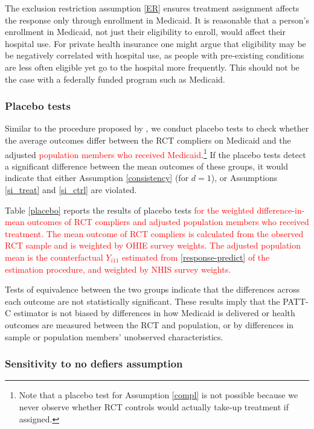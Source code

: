 \documentclass[hidelinks,12pt]{article}
\begin{document}
The exclusion restriction assumption \eqref{ER} ensures treatment assignment affects the response only through enrollment in Medicaid. It is reasonable that a person's enrollment in Medicaid, not just their eligibility to enroll, would affect their hospital use. For private health insurance one might argue that eligibility may be be negatively correlated with hospital use, as people with pre-existing conditions are less often eligible yet go to the hospital more frequently. This should not be the case with a federally funded program such as Medicaid. 

\subsubsection{Placebo tests} \label{placebo-tests}

Similar to the procedure proposed by \citep{Hartman}, we conduct placebo tests to check whether the average outcomes differ between the RCT compliers on Medicaid and the adjusted \textcolor{red}{population members who received Medicaid}.\footnote{Note that a placebo test for Assumption \eqref{compl} is not possible because we never observe whether RCT controls would actually take-up treatment if assigned.} If the placebo tests detect a significant difference between the mean outcomes of these groups, it would indicate that either Assumption \eqref{consistency} (for $d=1$), or Assumptions \eqref{si_treat} and \eqref{si_ctrl} are violated. 

Table \ref{placebo} reports the results of placebo tests \textcolor{red}{for the weighted difference-in-mean outcomes of RCT compliers and adjusted population members who received treatment. The mean outcome of RCT compliers is calculated from the observed RCT sample and is weighted by OHIE survey weights. The adjusted population mean is the counterfactual $Y_{i11}$ estimated from \ref{response-predict} of the estimation procedure, and weighted by NHIS survey weights.}

Tests of equivalence between the two groups indicate that the differences across each outcome are not statistically significant. These results imply that the PATT-C estimator is not biased by differences in how Medicaid is delivered or health outcomes are measured between the RCT and population, or by differences in sample or population members' unobserved characteristics. 

\subsubsection{Sensitivity to no defiers assumption} \label{sens-defiers}
\end{document}
